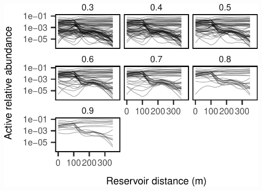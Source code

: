 \documentclass[]{article}
\begin{document}
\begin{center}\includegraphics{ReservoirGradient_files/figure-latex/unnamed-chunk-13-1} \end{center}
\end{document}
